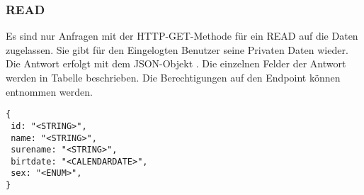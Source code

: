 \subsubsection{READ}
\label{sec:rest:api:user:read}
Es sind nur Anfragen mit der HTTP-GET-Methode für ein READ auf die Daten zugelassen.
Sie gibt für den Eingelogten Benutzer seine Privaten Daten wieder.
Die Antwort erfolgt mit dem JSON-Objekt . Die einzelnen Felder der Antwort werden in Tabelle  beschrieben.
Die Berechtigungen auf den Endpoint können  entnommen werden.

\begin{lstlisting}[caption={JSON-Antwort für einen GET-Aufruf der Route /api/user},label={lst:code:rest:api:user:read:ret},frame=tlrb]
{
 id: "<STRING>",
 name: "<STRING>",
 surename: "<STRING>",
 birtdate: "<CALENDARDATE>",
 sex: "<ENUM>",
}
\end{lstlisting}